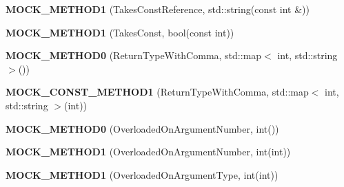 \begin{DoxyCompactItemize}
{\bfseries M\+O\+C\+K\+\_\+\+M\+E\+T\+H\+O\+D1} (Takes\+Const\+Reference, std\+::string(const int \&))
\item 
\mbox{\label{classtesting_1_1gmock__generated__function__mockers__test_1_1MockFoo_a7b548776b156454bcddecaca6294c52f}} 
{\bfseries M\+O\+C\+K\+\_\+\+M\+E\+T\+H\+O\+D1} (Takes\+Const, bool(const int))
\item 
\mbox{\label{classtesting_1_1gmock__generated__function__mockers__test_1_1MockFoo_adda63f3a046fadc9ad44731240d441e2}} 
{\bfseries M\+O\+C\+K\+\_\+\+M\+E\+T\+H\+O\+D0} (Return\+Type\+With\+Comma, std\+::map$<$ int, std\+::string $>$())
\item 
\mbox{\label{classtesting_1_1gmock__generated__function__mockers__test_1_1MockFoo_a921e9d77c56ab58ef3881de92ffa3ae0}} 
{\bfseries M\+O\+C\+K\+\_\+\+C\+O\+N\+S\+T\+\_\+\+M\+E\+T\+H\+O\+D1} (Return\+Type\+With\+Comma, std\+::map$<$ int, std\+::string $>$(int))
\item 
\mbox{\label{classtesting_1_1gmock__generated__function__mockers__test_1_1MockFoo_a1666c565d1b48b351a1a453f6f87ff22}} 
{\bfseries M\+O\+C\+K\+\_\+\+M\+E\+T\+H\+O\+D0} (Overloaded\+On\+Argument\+Number, int())
\item 
\mbox{\label{classtesting_1_1gmock__generated__function__mockers__test_1_1MockFoo_a45014dba5c27e9d59af3a94e0d324096}} 
{\bfseries M\+O\+C\+K\+\_\+\+M\+E\+T\+H\+O\+D1} (Overloaded\+On\+Argument\+Number, int(int))
\item 
\mbox{\label{classtesting_1_1gmock__generated__function__mockers__test_1_1MockFoo_ad900c5945fc52a0a95ca1480207c7add}} 
{\bfseries M\+O\+C\+K\+\_\+\+M\+E\+T\+H\+O\+D1} (Overloaded\+On\+Argument\+Type, int(int))
\item 
\mbox{\label{classtesting_1_1gmock__generated__function__mockers__test_1_1MockFoo_ab4b323a9c06a48c1116d55419195c1a6}} 

\end{DoxyCompactItemize}
